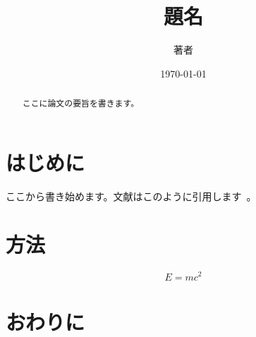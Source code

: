 \documentclass[a4paper,11pt]{ltjsarticle}
\title{題名}
\author{著者}
\date{\today}
\begin{document}
\maketitle

\begin{abstract}
  ここに論文の要旨を書きます。
\end{abstract}

\section{はじめに}

ここから書き始めます。文献はこのように引用します~\cite{okumura2023}。

\section{方法}

\begin{equation}
  E = mc^2
  \label{eq:energy}
\end{equation}

\section{おわりに}

\printbibliography
\end{document}
